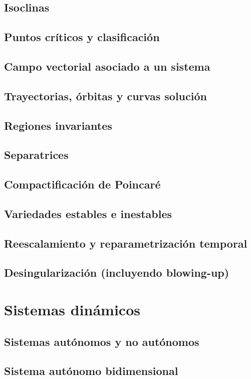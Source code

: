     \subsection{Isoclinas}
    \subsection{Puntos críticos y clasificación}
    \subsection{Campo vectorial asociado a un sistema}
    \subsection{Trayectorias, órbitas y curvas solución}
    \subsection{Regiones invariantes}
    \subsection{Separatrices}
    \subsection{Compactificación de Poincaré}
    \subsection{Variedades estables e inestables}
    \subsection{Reescalamiento y reparametrización temporal}
    \subsection{Desingularización (incluyendo blowing-up)}
    
    \section{Sistemas dinámicos}
    \subsection{Sistemas autónomos y no autónomos}
    \subsection{Sistema autónomo bidimensional}
